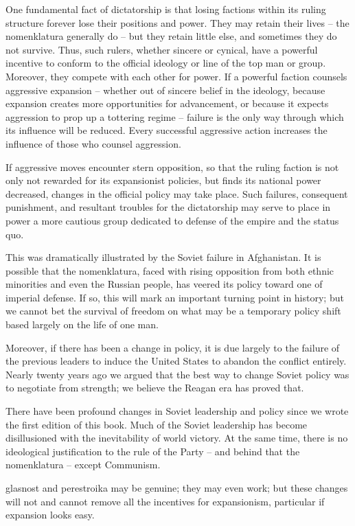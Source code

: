One fundamental fact of dictatorship is that losing factions within its ruling structure forever lose their positions and power. They may retain their lives -- the nomenklatura generally do -- but they retain little else, and sometimes they do not survive. Thus, such rulers, whether sincere or cynical, have a powerful incentive to conform to the official ideology or line of the top man or group. Moreover, they compete with each other for power. If a powerful faction counsels aggressive expansion -- whether out of sincere belief in the ideology, because expansion creates more opportunities for advancement, or because it expects aggression to prop up a tottering regime -- failure is the only way through which its influence will be reduced. Every successful aggressive action increases the influence of those who counsel aggression.

If aggressive moves encounter stern opposition, so that the ruling faction is not only not rewarded for its expansionist policies, but finds its national power decreased, changes in the official policy may take place. Such failures, consequent punishment, and resultant troubles for the dictatorship may serve to place in power a more cautious group dedicated to defense of the empire and the status quo.

This was dramatically illustrated by the Soviet failure in Afghanistan.
It is possible that the nomenklatura, faced with rising opposition from both ethnic minorities and even the Russian people, has veered its policy toward one of imperial defense. If so, this will mark an important turning point in history; but we cannot bet the survival of freedom on what may be a temporary policy shift based largely on the life of one man.

Moreover, if there has been a change in policy, it is due largely to the failure of the previous leaders to induce the United States to abandon the conflict entirely. Nearly twenty years ago we argued that the best way to change Soviet policy was to negotiate from strength; we believe the Reagan era has proved that.

There have been profound changes in Soviet leadership and policy since we wrote the first edition of this book. Much of the Soviet leadership has become disillusioned with the inevitability of world victory. At the same time, there is no ideological justification to the rule of the Party -- and behind that the nomenklatura -- except Communism.

glasnost and perestroika may be genuine; they may even work; but these changes will not and cannot remove all the incentives for expansionism, particular if expansion looks easy.

